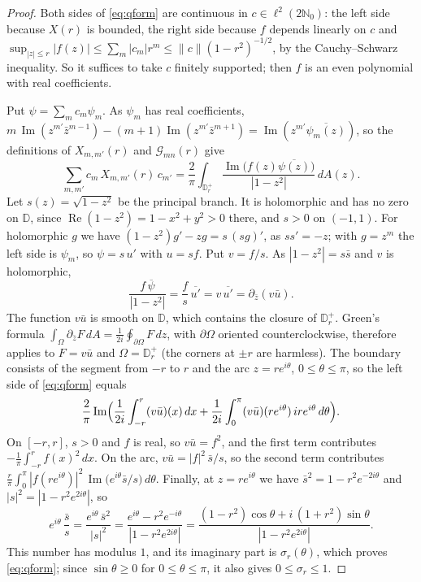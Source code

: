 \documentclass[11pt]{amsart}
\theoremstyle{definition}
\theoremstyle{remark}
\numberwithin{equation}{section}
\newcommand{\N}{\mathbb{N}}
\newcommand{\D}{\mathbb{D}}
\DeclareMathOperator{\re}{Re}
\DeclareMathOperator{\im}{Im}
\begin{document}
\begin{proof}
Both sides of \eqref{eq:qform} are continuous in $c\in\ell^2(2\N_0)$: the left side because $X(r)$ is bounded, the right side because $f$ depends linearly on $c$ and $\sup_{|z|\le r}|f(z)|\le\sum_m|c_m|r^m\le\|c\|(1-r^2)^{-1/2}$, by the Cauchy--Schwarz inequality. So it suffices to take $c$ finitely supported; then $f$ is an even polynomial with real coefficients.

Put $\psi=\sum_mc_m\psi_m$. As $\psi_m$ has real coefficients, $m\,\im(z^{m'}\bar z^{m-1})-(m+1)\im(z^{m'}\bar z^{m+1})=\im(z^{m'}\overline{\psi_m(z)})$, so the definitions of $X_{m,m'}(r)$ and $\mathcal G_{mn}(r)$ give
\[
\sum_{m,m'}c_m\,X_{m,m'}(r)\,c_{m'}=\frac2\pi\int_{\D_r^+}\frac{\im\bigl(f(z)\overline{\psi(z)}\bigr)}{|1-z^2|}\,dA(z).
\]
Let $s(z)=\sqrt{1-z^2}$ be the principal branch. It is holomorphic and has no zero on $\D$, since $\re(1-z^2)=1-x^2+y^2>0$ there, and $s>0$ on $(-1,1)$. For holomorphic $g$ we have $(1-z^2)g'-zg=s\,(sg)'$, as $ss'=-z$; with $g=z^m$ the left side is $\psi_m$, so $\psi=s\,u'$ with $u=sf$. Put $v=f/s$. As $|1-z^2|=s\bar s$ and $v$ is holomorphic,
\[
\frac{f\,\overline\psi}{|1-z^2|}=\frac fs\,\overline{u'}=v\,\overline{u'}=\partial_{\bar z}(v\bar u).
\]
The function $v\bar u$ is smooth on $\D$, which contains the closure of $\D_r^+$. Green's formula $\int_\Omega\partial_{\bar z}F\,dA=\frac1{2i}\oint_{\partial\Omega}F\,dz$, with $\partial\Omega$ oriented counterclockwise, therefore applies to $F=v\bar u$ and $\Omega=\D_r^+$ (the corners at $\pm r$ are harmless). The boundary consists of the segment from $-r$ to $r$ and the arc $z=re^{i\theta}$, $0\le\theta\le\pi$, so the left side of \eqref{eq:qform} equals
\[
\frac2\pi\im\Bigl(\frac1{2i}\int_{-r}^r(v\bar u)(x)\,dx+\frac1{2i}\int_0^\pi(v\bar u)(re^{i\theta})\,ire^{i\theta}\,d\theta\Bigr).
\]
On $[-r,r]$, $s>0$ and $f$ is real, so $v\bar u=f^2$, and the first term contributes $-\frac1\pi\int_{-r}^rf(x)^2\,dx$. On the arc, $v\bar u=|f|^2\,\bar s/s$, so the second term contributes $\frac r\pi\int_0^\pi|f(re^{i\theta})|^2\,\im\bigl(e^{i\theta}\bar s/s\bigr)\,d\theta$. Finally, at $z=re^{i\theta}$ we have $\bar s^2=1-r^2e^{-2i\theta}$ and $|s|^2=|1-r^2e^{2i\theta}|$, so
\[
e^{i\theta}\,\frac{\bar s}{s}=\frac{e^{i\theta}\,\bar s^2}{|s|^2}=\frac{e^{i\theta}-r^2e^{-i\theta}}{|1-r^2e^{2i\theta}|}=\frac{(1-r^2)\cos\theta+i\,(1+r^2)\sin\theta}{|1-r^2e^{2i\theta}|}.
\]
This number has modulus $1$, and its imaginary part is $\sigma_r(\theta)$, which proves \eqref{eq:qform}; since $\sin\theta\ge0$ for $0\le\theta\le\pi$, it also gives $0\le\sigma_r\le1$.
\end{proof}
\end{document}
